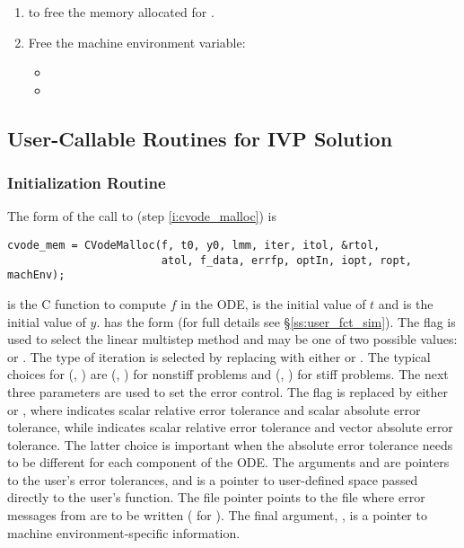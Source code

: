 \begin{enumerate}
\item {} to free the memory allocated for {\cvode}.
  
\item Free the machine environment variable:
  \begin{itemize}
  \item {\s}
  \item {\p}
  \end{itemize}
  
\end{enumerate}

\subsection{User-Callable Routines for IVP Solution}
\label{ss:cvodes_fct_sim}

\subsubsection{{\cvode} Initialization Routine}\label{sss:cvodemalloc}

The form of the call to  (step \ref{i:cvode_malloc}) is
\begin{verbatim}
cvode_mem = CVodeMalloc(f, t0, y0, lmm, iter, itol, &rtol, 
                        atol, f_data, errfp, optIn, iopt, ropt, machEnv);
\end{verbatim}
 is the C function to compute $f$ in the ODE,  is the initial
value of $t $ and  is the initial value of $y$. 
 has the form  (for full details
see \S\ref{ss:user_fct_sim}).
The flag  is used to select the linear multistep method and may be one of two
possible values:  or . The type of iteration is
selected by replacing  with either  or 
. The typical choices for (, ) are
(, ) for nonstiff problems and
(, ) for stiff problems.
The next three parameters are used to set the error control. 
The flag  is replaced by either  or 
, where  indicates scalar relative error tolerance and
scalar absolute error tolerance, while  indicates scalar
relative error tolerance and vector absolute error tolerance. The
latter choice is important when the absolute error tolerance needs to
be different for each component of the ODE. The arguments 
and  are pointers to the user's error tolerances, and 
 is a pointer to user-defined space passed directly to
the user's  function. The file pointer  points to
the file where error messages from {\cvode} are to be written 
( for ). 
The final argument, , is a pointer to machine 
environment-specific information.

